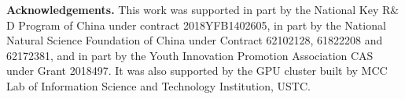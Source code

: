 \documentclass[letterpaper]{article} \usepackage{aaai22}  \usepackage{times}  \usepackage{helvet}  \usepackage{courier}  \usepackage[hyphens]{url}  \usepackage{graphicx} \urlstyle{rm} \def\UrlFont{\rm}  \usepackage{natbib}  \usepackage{caption} \DeclareCaptionStyle{ruled}{labelfont=normalfont,labelsep=colon,strut=off} \frenchspacing  \setlength{\pdfpagewidth}{8.5in}  \setlength{\pdfpageheight}{11in}  \usepackage{algorithm}
\begin{document}
{\flushleft \bf Acknowledgements.} This work was supported in part by the National Key R$\&$D Program of China under contract 2018YFB1402605, in part by the National Natural Science Foundation of China under Contract 62102128, 61822208 and 62172381, and in part by the Youth Innovation Promotion Association CAS under Grant 2018497. It was also supported by the GPU cluster built by MCC Lab of Information Science and Technology Institution, USTC.


{
	\small
	
}	
\end{document}
